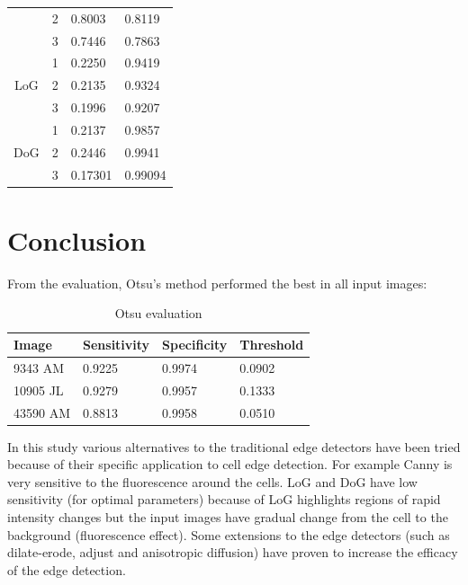 \documentclass{article}
\begin{document}
\begin{table}[H]
\begin{tabular}{|c|c|l|l|}
                                    & 2                          & 0.8003      & 0.8119      \\ \cline{2-4} 
                                    & 3                          & 0.7446      & 0.7863      \\ \hline
\multirow{3}{*}{LoG}                & 1                          & 0.2250      & 0.9419      \\ \cline{2-4} 
                                    & 2                          & 0.2135      & 0.9324      \\ \cline{2-4} 
                                    & 3                          & 0.1996      & 0.9207      \\ \hline
\multirow{3}{*}{DoG}                & 1                          & 0.2137      & 0.9857      \\ \cline{2-4} 
                                    & 2                          & 0.2446      & 0.9941      \\ \cline{2-4} 
                                    & 3                          & 0.17301     & 0.99094     \\ \hline
\end{tabular}
\end{table}
	
	\section{Conclusion}

	From the evaluation, Otsu's method performed the best in all input images:
	
\begin{table}[H]
\centering
\caption{Otsu evaluation}
\label{otsu}
\begin{tabular}{@{}llll@{}}
\toprule
Image    & Sensitivity & Specificity & Threshold \\ \midrule
9343 AM  & 0.9225      & 0.9974      & 0.0902    \\
10905 JL & 0.9279      & 0.9957      & 0.1333    \\
43590 AM & 0.8813      & 0.9958      & 0.0510    \\ \bottomrule
\end{tabular}
\end{table}

	In this study various alternatives to the traditional edge detectors have been
	tried because of their specific application to cell edge detection. For example
	Canny is very sensitive to the fluorescence around the cells. LoG and DoG have
	low sensitivity (for optimal parameters) because of LoG highlights regions
	of rapid intensity changes but the input images have gradual
	change from the cell to the background (fluorescence effect). Some extensions to
	the edge detectors (such as dilate-erode, adjust and anisotropic diffusion)
	have proven to increase the efficacy of the edge detection. 
\end{document}
